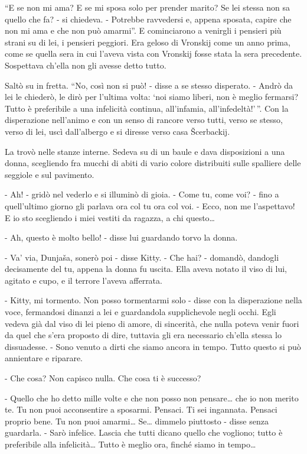 ``E se non mi ama? E se mi sposa solo per prender marito? Se lei stessa non sa quello che fa? - si chiedeva. - Potrebbe ravvedersi e, appena sposata, capire che non mi ama e che non può amarmi''. E cominciarono a venirgli i pensieri più strani su di lei, i pensieri peggiori. Era geloso di Vronskij come un anno prima, come se quella sera in cui l'aveva vista con Vronskij fosse stata la sera precedente. Sospettava ch'ella non gli avesse detto tutto. 

Saltò su in fretta. ``No, così non si può! - disse a se stesso disperato. - Andrò da lei le chiederò, le dirò per l'ultima volta: `noi siamo liberi, non è meglio fermarsi? Tutto è preferibile a una infelicità continua, all'infamia, all'infedeltà!'\,''. Con la disperazione nell'animo e con un senso di rancore verso tutti, verso se stesso, verso di lei, uscì dall'albergo e si diresse verso casa Šcerbackij. 

La trovò nelle stanze interne. Sedeva su di un baule e dava disposizioni a una donna, scegliendo fra mucchi di abiti di vario colore distribuiti sulle spalliere delle seggiole e sul pavimento. 

- Ah! - gridò nel vederlo e si illuminò di gioia. - Come tu, come voi? - fino a quell'ultimo giorno gli parlava ora col tu ora col voi. - Ecco, non me l'aspettavo! E io sto scegliendo i miei vestiti da ragazza, a chi questo\ldots{} 

- Ah, questo è molto bello! - disse lui guardando torvo la donna. 

- Va' via, Dunjaša, sonerò poi - disse Kitty. - Che hai? - domandò, dandogli decisamente del tu, appena la donna fu uscita. Ella aveva notato il viso di lui, agitato e cupo, e il terrore l'aveva afferrata. 

- Kitty, mi tormento. Non posso tormentarmi solo - disse con la disperazione nella voce, fermandosi dinanzi a lei e guardandola supplichevole negli occhi. Egli vedeva già dal viso di lei pieno di amore, di sincerità, che nulla poteva venir fuori da quel che s'era proposto di dire, tuttavia gli era necessario ch'ella stessa lo dissuadesse. - Sono venuto a dirti che siamo ancora in tempo. Tutto questo si può annientare e riparare. 

- Che cosa? Non capisco nulla. Che cosa ti è successo? 

- Quello che ho detto mille volte e che non posso non pensare\ldots{} che io non merito te. Tu non puoi acconsentire a sposarmi. Pensaci. Ti sei ingannata. Pensaci proprio bene. Tu non puoi amarmi\ldots{} Se\ldots{} dimmelo piuttosto - disse senza guardarla. - Sarò infelice. Lascia che tutti dicano quello che vogliono; tutto è preferibile alla infelicità\ldots{} Tutto è meglio ora, finché siamo in tempo\ldots{} 

